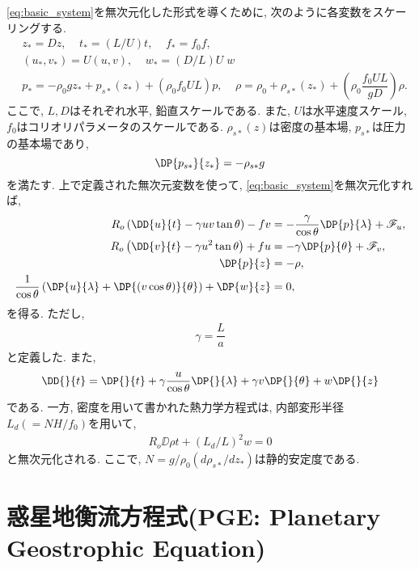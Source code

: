 \eqref{eq:basic_system}を無次元化した形式を導くために,  
次のように各変数をスケーリングする. 
\begin{align*}
  & z_*=Dz, \;\;\;\;  t_* = (L/U)t, \;\;\;\; f_* = f_0 f, \\
  & (u_*,v_*) = U (u, v), \;\;\;\; w_* = (D/L)U \; w \\
  & p_* = - \rho_0 g z_* + p_{s*}(z_*) +  (\rho_0 f_0 U L) p, \;\;\;\;
   \rho = \rho_0 + \rho_{s*}(z_*) + (\rho_0 \dfrac{f_0 UL}{gD}) \rho. 
\end{align*}
ここで, $L, D$はそれぞれ水平, 鉛直スケールである. 
また, $U$は水平速度スケール, $f_0$はコリオリパラメータのスケールである. 
$\rho_{s*}(z)$は密度の基本場, $p_{s*}$は圧力の基本場であり, 
$$
 \DP{p_{s*}}{z_*} = - \rho_{s*} g
$$
を満たす. 
上で定義された無次元変数を使って, \eqref{eq:basic_system}を無次元化すれば, 
\begin{subequations} %
  \begin{align}
    R_o \left( \DD{u}{t} - \gamma uv \tan\theta \right)  - f v  &= - \dfrac{\gamma}{\cos \theta} \DP{p}{\lambda} + \mathscr{F}_u, \\
    R_o \left( \DD{v}{t} - \gamma u^2 \tan\theta \right)   + fu &= - \gamma \DP{p}{\theta} + \mathscr{F}_v, \\
    \DP{p}{z} &= - \rho, \\
    \dfrac{1}{\cos \theta} \left( \DP{u}{\lambda} + \DP{ (v \cos{\theta})}{\theta} \right)  + \DP{w}{z} &= 0, \\
  \end{align}
\label{eq:basic_system_nondim}
\end{subequations}
を得る. 
ただし, 
\begin{align}
  \gamma = \dfrac{L}{a}
\end{align}
と定義した. また, 
\begin{equation}
  \DD{}{t} =  \DP{}{t} + \gamma \dfrac{u}{\cos \theta}\DP{}{\lambda} + \gamma v \DP{}{\theta} + w\DP{}{z}
\end{equation}
である. 
一方, 密度を用いて書かれた熱力学方程式は, 
内部変形半径$L_d(=NH/f_0)$を用いて, 
\begin{align}
   R_o \DD{\rho}{t} + (L_d/L)^2 w = 0
\label{eq:basic_system_densEq_nondim}  
\end{align}
と無次元化される. 
ここで, $N=g/\rho_0 (d\rho_{s*}/dz_*)$は静的安定度である. 


\section{惑星地衡流方程式(PGE: Planetary Geostrophic Equation)}


